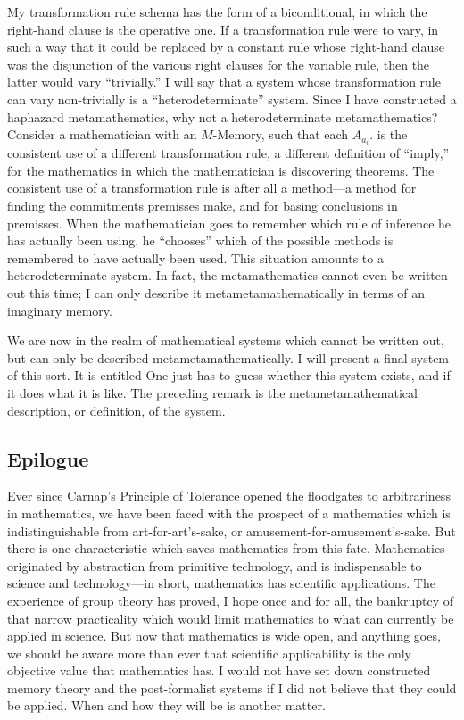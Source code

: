 My transformation rule schema has the form of a biconditional, in 
which the right-hand clause is the operative one. If a transformation rule were to 
vary, in such a way that it could be replaced by a constant rule whose right-hand
clause was the disjunction of the various right clauses for the variable rule, 
then the latter would vary \enquote{trivially.} I will say that a system whose 
transformation rule can vary non-trivially is a \enquote{heterodeterminate} system. 
Since I have constructed a haphazard metamathematics, why not a 
heterodeterminate metamathematics? Consider a mathematician with an 
$M$-Memory, such that each $A_{a_i}$. is the consistent use of a different 
transformation rule, a different definition of \enquote{imply,} for the mathematics 
in which the mathematician is discovering theorems. The consistent use of a 
transformation rule is after all a method---a method for finding the 
commitments premisses make, and for basing conclusions in premisses. When 
the mathematician goes to remember which rule of inference he has actually 
been using, he \enquote{chooses} which of the possible methods is remembered to 
have actually been used. This situation amounts to a heterodeterminate 
system. In fact, the metamathematics cannot even be written out this time; I 
can only describe it metametamathematically in terms of an imaginary 
memory. 

We are now in the realm of mathematical systems which cannot be 
written out, but can only be described metametamathematically. I will 
present a final system of this sort. It is entitled  One just has to guess whether this system exists, 
and if it does what it is like. The preceding remark is the 
metametamathematical description, or definition, of the system. 

\subsection{Epilogue}

Ever since Carnap's Principle of Tolerance opened the floodgates to 
arbitrariness in mathematics, we have been faced with the prospect of a 
mathematics which is  indistinguishable from  art-for-art's-sake, or 
amusement-for-amusement's-sake. But there is one characteristic which saves 
mathematics from this fate. Mathematics originated by abstraction from 
primitive technology, and is indispensable to science and technology---in 
short, mathematics has scientific applications. The experience of group 
theory has proved, I hope once and for all, the bankruptcy of that narrow 
practicality which would limit mathematics to what can currently be applied 
in science. But now that mathematics is wide open, and anything goes, we 
should be aware more than ever that scientific applicability is the only 
objective value that mathematics has. I would not have set down constructed 
memory theory and the post-formalist systems if I did not believe that they 
could be applied. When and how they will be is another matter. 

